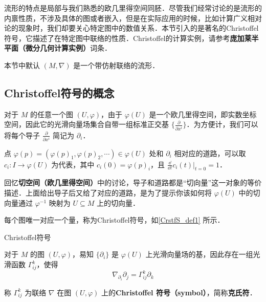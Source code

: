 


流形的特点是局部与我们熟悉的欧几里得空间同胚．尽管我们经常讨论的是流形的内禀性质，不涉及具体的图或者嵌入，但是在实际应用的时候，比如计算广义相对论的现象时，我们却要关心特定图中的数值关系．本节引入的是著名的Christoffel符号，它描述了在特定图中联络的性质．Christoffel的计算实例，请参考\textbf{庞加莱半平面（微分几何计算实例）}词条．

本节中默认 $(M, \nabla)$ 是一个带仿射联络的流形．


\subsection{Christoffel符号的概念}\label{CrstfS_sub1}

对于 $M$ 的任意一个图 $(U, \varphi)$，由于 $\varphi(U)$ 是一个欧几里得空间，即实数坐标空间，因此它的光滑向量场集合自带一组标准正交基 $\{\frac{\partial}{\partial x^i}\}$．为方便计，我们可以将每个导子 $\frac{\partial}{\partial x^i}$ 简记为 $\partial_i$．

点 $\varphi(p)=(\varphi(p)_1, \varphi(p)_2, \cdots)\in\varphi(U)$ 处和 $\partial_i$ 相对应的道路，可以取 $c_i:I\to \varphi(U)$ 为代表，其中 $c_i(0)=\varphi(p)_i$，且 $\frac{\dd}{\dd t}c_i(t)|_{t=0}=1$．

回忆\textbf{切空间（欧几里得空间）}中的讨论，导子和道路都是“切向量”这一对象的等价描述．上面给出导子后又给了对应的道路，是为了提示你该如何将 $\varphi(U)$ 中的切向量通过 $\varphi^{-1}$ 映射为 $U\subseteq M$ 上的切向量．

每个图唯一对应一个量，称为Christoffel符号，如\autoref{CrstfS_def1} 所示．

\begin{definition}{Christoffel符号}\label{CrstfS_def1}

对于 $M$ 的图 $(U, \varphi)$，易知 $\{\partial_i\}$ 是 $\varphi(U)$ 上光滑向量场的基，因此存在一组光滑函数 $\Gamma^k_{ij}$，使得
\begin{equation}
\nabla_{\partial_i}\partial_j=\Gamma^k_{ij}\partial_k
\end{equation}

称 $\Gamma^k_{ij}$ 为联络 $\nabla$ 在图 $(U, \varphi)$ 上的\textbf{Christoffel 符号（symbol）}，简称\textbf{克氏符}．
\end{definition}

